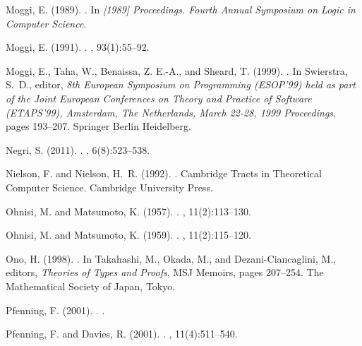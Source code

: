 \documentclass[a4paper]{amsart}
\begin{document}
\begin{thebibliography}{}
Moggi, E. (1989).
.
\newblock In {\em [1989] Proceedings. Fourth Annual Symposium on Logic in
  Computer Science}.

Moggi, E. (1991).
.
, 93(1):55--92.

Moggi, E., Taha, W., Benaissa, Z. E.-A., and Sheard, T. (1999).
.
\newblock In Swierstra, S.~D., editor, {\em 8th European Symposium on
  Programming (ESOP'99) held as part of the Joint European Conferences on
  Theory and Practice of Software (ETAPS'99), Amsterdam, The Netherlands, March
  22-28, 1999 Proceedings}, pages 193--207. Springer Berlin Heidelberg.

Negri, S. (2011).
.
, 6(8):523--538.

Nielson, F. and Nielson, H.~R. (1992).
.
\newblock Cambridge Tracts in Theoretical Computer Science. Cambridge
  University Press.

Ohnisi, M. and Matsumoto, K. (1957).
.
, 11(2):113--130.

Ohnisi, M. and Matsumoto, K. (1959).
.
, 11(2):115--120.

Ono, H. (1998).
.
\newblock In Takahashi, M., Okada, M., and Dezani-Ciancaglini, M., editors,
  {\em Theories of Types and Proofs}, MSJ Memoirs, pages 207--254. The
  Mathematical Society of Japan, Tokyo.

Pfenning, F. (2001).
.
.

Pfenning, F. and Davies, R. (2001).
.
, 11(4):511--540.


\end{thebibliography}
\end{document}
